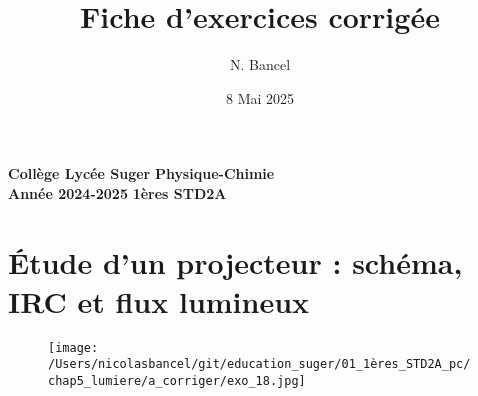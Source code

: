 \documentclass[answers]{exam}
\title{Fiche d'exercices corrigée}
\author{N. Bancel}
\date{8 Mai 2025}
\begin{document}
\textbf{Collège Lycée Suger}
\hfill
\textbf{Physique-Chimie} \\

\textbf{Année 2024-2025}
\hfill
\textbf{1ères STD2A} \par

{\let\newpage\relax\maketitle}




\section*{Étude d'un projecteur : schéma, IRC et flux lumineux}

    \begin{figure}[H]
      \centering
      \texttt{[image: /Users/nicolasbancel/git/education\_suger/01\_1ères\_STD2A\_pc/chap5\_lumiere/a\_corriger/exo\_18.jpg]}
      \captionsetup{labelformat=empty}
    \end{figure}
\end{document}
